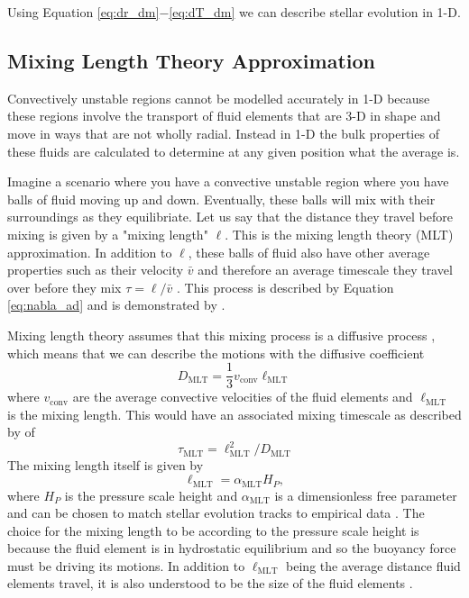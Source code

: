Using Equation \ref{eq:dr_dm}$-$\ref{eq:dT_dm} we can describe stellar evolution in 1-D.

\subsection{Mixing Length Theory Approximation}

Convectively unstable regions cannot be modelled accurately in 1-D because these regions involve the transport of fluid elements that are 3-D in shape and move in ways that are not wholly radial.
Instead in 1-D the bulk properties of these fluids are calculated to determine at any given position what the average is.

Imagine a scenario where you have a convective unstable region where you have balls of fluid moving up and down.
Eventually, these balls will mix with their surroundings as they equilibriate.
Let us say that the distance they travel before mixing is given by a "mixing length" $\ell$. 
This is the mixing length theory (MLT) approximation.
In addition to $\ell$, these balls of fluid also have other average properties such as their velocity $\bar{v}$ and therefore an average timescale they travel over before they mix $\tau=\ell/\bar{v}$ \cite{kippenhahnStellarStructureEvolution2013,coxPrinciplesStellarStructure1968}.
This process is described by Equation \ref{eq:nabla_ad} and is demonstrated by \cite{joyceReviewMixingLength2023}.

Mixing length theory assumes that this mixing process is a diffusive process \cite{joyceReviewMixingLength2023}, which means that we can describe the motions with the diffusive coefficient
\begin{equation}\label{eq:d_mlt}
    D_{\mathrm{MLT}} = \frac{1}{3}v_{\mathrm{conv}}\ell_{\mathrm{MLT}}
\end{equation}
where $v_{\mathrm{conv}}$ are the average convective velocities of the fluid elements and $\ell_{\mathrm{MLT}}$ is the mixing length.
This would have an associated mixing timescale as described by \cite{herwigCONVECTIVEREACTIVEPROTON2011} of
\begin{equation}\label{eq:t_mlt}
    \tau_{\mathrm{MLT}} = \ell_{\mathrm{MLT}}^2/D_{\mathrm{MLT}}
\end{equation}
The mixing length itself is given by
\begin{equation}
\ell_{\mathrm{MLT}} = \alpha_{\text{MLT}} H_P,
\end{equation}
where $H_P$ is the pressure scale height and $\alpha_{\mathrm{ MLT}}$ is a dimensionless free parameter and can be chosen to match stellar evolution tracks to empirical data \cite{joyceReviewMixingLength2023}.
The choice for the mixing length to be according to the pressure scale height is because the fluid element is in hydrostatic equilibrium and so the buoyancy force must be driving its motions.
In addition to $\ell_{\mathrm{MLT}}$ being the average distance fluid elements travel, it is also understood to be the size of the fluid elements \cite{coxPrinciplesStellarStructure1968}.

